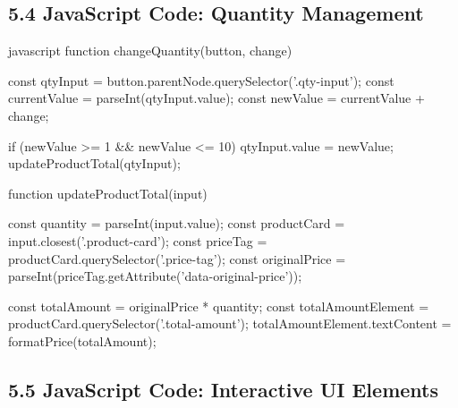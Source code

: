\documentclass[a4paper,12pt]{article}
\begin{document}
\subsection*{5.4 JavaScript Code: Quantity Management}
\begin{code}[fontsize=\small]{javascript}
  function changeQuantity(button, change) {
      const qtyInput = button.parentNode.querySelector('.qty-input');
      const currentValue = parseInt(qtyInput.value);
      const newValue = currentValue + change;

      if (newValue >= 1 && newValue <= 10) {
          qtyInput.value = newValue;
          updateProductTotal(qtyInput);
        }
    }

  function updateProductTotal(input) {
      const quantity = parseInt(input.value);
      const productCard = input.closest('.product-card');
      const priceTag = productCard.querySelector('.price-tag');
      const originalPrice = parseInt(priceTag.getAttribute('data-original-price'));

      const totalAmount = originalPrice * quantity;
      const totalAmountElement = productCard.querySelector('.total-amount');
      totalAmountElement.textContent = formatPrice(totalAmount);
    }
\end{code}

\subsection*{5.5 JavaScript Code: Interactive UI Elements}
\end{document}
